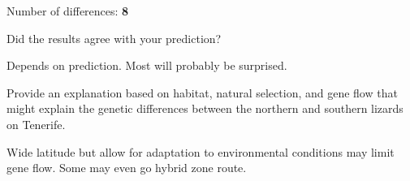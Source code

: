 \documentclass[12pt, hidelinks]{exam}
\newcommand*\AnswerBox[2]{%
    \parbox[t][#1]{0.92\textwidth}{%
    \begin{solution}#2\end{solution}}
    \vspace{\stretch{1}}
}
\begin{document}
\begin{questions}
Number of differences: \ifprintanswers \textbf{8} \fi

\vspace{\baselineskip}

\question
Did the results agree with your prediction? 

\AnswerBox{2\baselineskip}{Depends on prediction. Most will probably be surprised.}

\question
Provide an explanation based on habitat, natural selection, and gene flow that might explain the genetic differences between the northern and southern lizards on Tenerife.

\AnswerBox{3\baselineskip}{Wide latitude but allow for adaptation to environmental conditions may limit gene flow. Some may even go hybrid zone route.}


\end{questions}


\newpage
\end{document}

